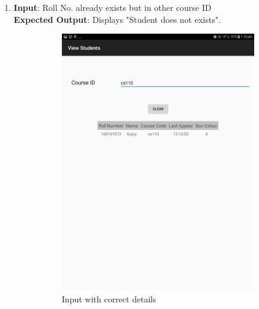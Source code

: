 \documentclass{scrreprt}
\begin{document}
\begin{itemize}
\begin{enumerate}
\item \textbf{Input}:  Roll No. already exists but in other course ID\\
\textbf{Expected Output}: Displays "Student does not exists".
\begin{figure}[H]
\begin{subfigure}{0.5\textwidth}
\includegraphics[width=0.85\linewidth, keepaspectratio]{deleteshow.jpg} 
\caption{Input with correct details}
\label{fig:subim1}
\end{subfigure}
\begin{subfigure}{0.5\textwidth}

\end{subfigure}
\end{figure}
\end{enumerate}
\end{itemize}
\end{document}
